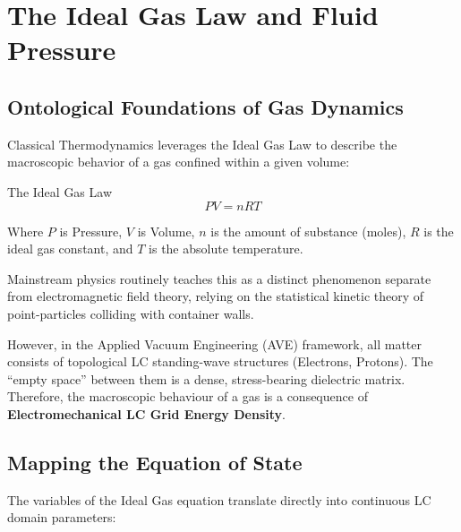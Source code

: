 \chapter{The Ideal Gas Law and Fluid Pressure}
\label{ch:ideal_gas_law}

\section{Ontological Foundations of Gas Dynamics}
Classical Thermodynamics leverages the Ideal Gas Law to describe the macroscopic behavior of a gas confined within a given volume:
\begin{resultbox}{The Ideal Gas Law}
\begin{equation}
    PV = nRT
\end{equation}
\end{resultbox}
Where $P$ is Pressure, $V$ is Volume, $n$ is the amount of substance (moles), $R$ is the ideal gas constant, and $T$ is the absolute temperature.

Mainstream physics routinely teaches this as a distinct phenomenon separate from electromagnetic field theory, relying on the statistical kinetic theory of point-particles colliding with container walls. 

However, in the Applied Vacuum Engineering (AVE) framework, all matter consists of topological LC standing-wave structures (Electrons, Protons). The ``empty space'' between them is a dense, stress-bearing dielectric matrix. Therefore, the macroscopic behaviour of a gas is a consequence of \textbf{Electromechanical LC Grid Energy Density}.

\section{Mapping the Equation of State}
The variables of the Ideal Gas equation translate directly into continuous LC domain parameters:

